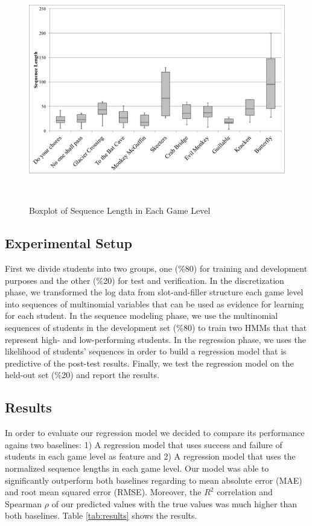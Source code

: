 \documentclass{sigchi}
\begin{document}
\begin{figure}
	\centering
	\includegraphics[width=0.9\columnwidth]{figures/boxplot}
	\caption{Boxplot of Sequence Length in Each Game Level}~\label{fig:boxplot}
\end{figure}

\subsection{Experimental Setup}
First we divide students into two groups, one (\%80) for training and development purposes and the other (\%20) for test and verification.
In the discretization phase, we transformed the log data from slot-and-filler structure each game level into sequences of multinomial variables that can be used as evidence for learning for each student.
In the sequence modeling phase, we use the multinomial sequences of students in the development set (\%80) to train two HMMs that that represent high- and low-performing students.
In the regression phase, we uses the likelihood of students' sequences in order to build a regression model that is predictive of the post-test results.
Finally, we test the regression model on the held-out set (\%20) and report the results.


\subsection{Results}
In order to evaluate our regression model we decided to compare its performance agains two baselines: 1) A regression model that uses success and failure of students in each game level as feature and 2) A regression model that uses the normalized sequence lengths in each game level. 
Our model was able to significantly outperform both baselines regarding to mean absolute error (MAE) and root mean squared error (RMSE). 
Moreover, the $R^2$ correlation and Spearman $\rho$ of our predicted values with the true values was much higher than both baselines. 
Table \ref{tab:results} shows the results. 
\end{document}
